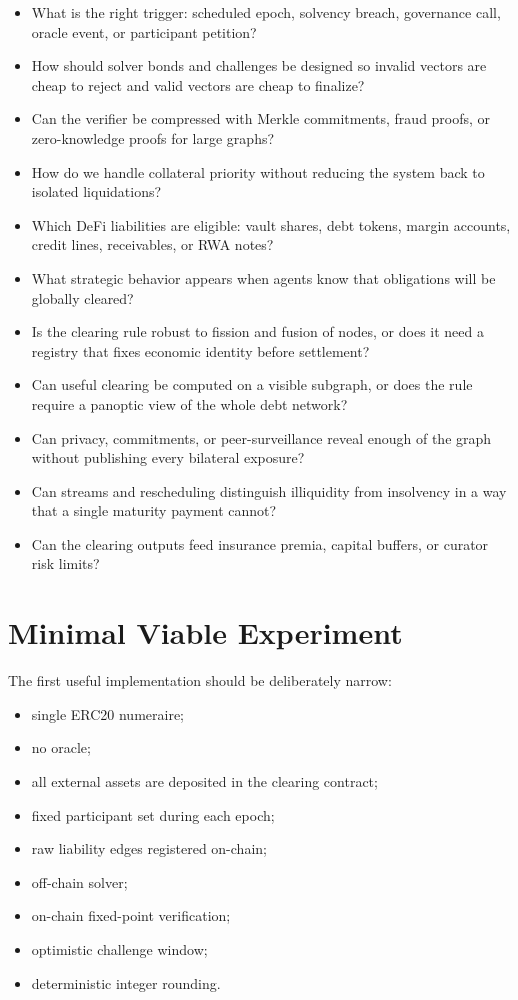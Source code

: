 \documentclass[11pt,oneside]{article}
\begin{document}
\begin{itemize}[leftmargin=1.5em]
  \item What is the right trigger: scheduled epoch, solvency breach, governance
  call, oracle event, or participant petition?
  \item How should solver bonds and challenges be designed so invalid vectors
  are cheap to reject and valid vectors are cheap to finalize?
  \item Can the verifier be compressed with Merkle commitments, fraud proofs, or
  zero-knowledge proofs for large graphs?
  \item How do we handle collateral priority without reducing the system back to
  isolated liquidations?
  \item Which DeFi liabilities are eligible: vault shares, debt tokens, margin
  accounts, credit lines, receivables, or RWA notes?
  \item What strategic behavior appears when agents know that obligations will
  be globally cleared?
  \item Is the clearing rule robust to fission and fusion of nodes, or does it
  need a registry that fixes economic identity before settlement?
  \item Can useful clearing be computed on a visible subgraph, or does the rule
  require a panoptic view of the whole debt network?
  \item Can privacy, commitments, or peer-surveillance reveal enough of the
  graph without publishing every bilateral exposure?
  \item Can streams and rescheduling distinguish illiquidity from insolvency in
  a way that a single maturity payment cannot?
  \item Can the clearing outputs feed insurance premia, capital buffers, or
  curator risk limits?
\end{itemize}

\section{Minimal Viable Experiment}

The first useful implementation should be deliberately narrow:

\begin{itemize}[leftmargin=1.5em]
  \item single ERC20 numeraire;
  \item no oracle;
  \item all external assets are deposited in the clearing contract;
  \item fixed participant set during each epoch;
  \item raw liability edges registered on-chain;
  \item off-chain solver;
  \item on-chain fixed-point verification;
  \item optimistic challenge window;
  \item deterministic integer rounding.
\end{itemize}
\end{document}
